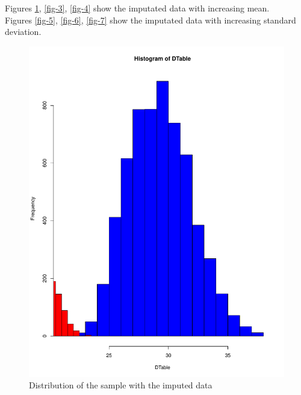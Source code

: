\documentclass[10pt,a4paper]{article}
\begin{document}
\begin{enumerate}
Figures \ref{fig-2}, \ref{fig-3}, \ref{fig-4} show the imputated data with increasing mean.\\
Figures \ref{fig-5}, \ref{fig-6}, \ref{fig-7} show the imputated data with increasing standard deviation.\\
\begin{figure}
\includegraphics[scale=0.3]{Hist1.pdf}
\caption{Distribution of the sample with the imputed data}
\label{fig-2}
\end{figure}
\begin{figure}

\end{figure}
\end{enumerate}
\end{document}
